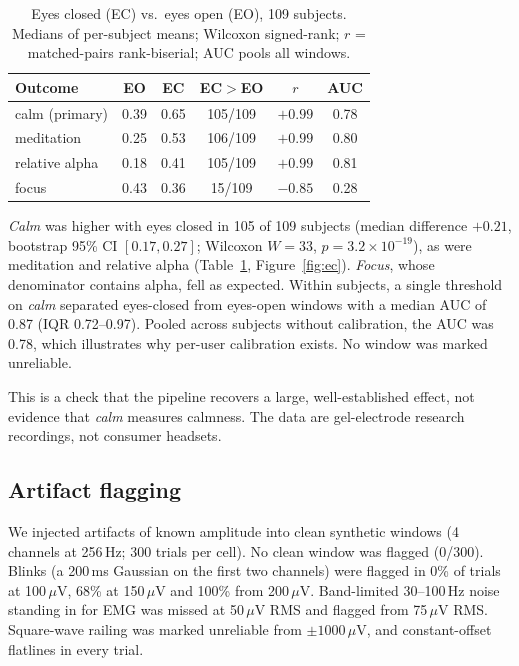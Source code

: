 \documentclass[10pt,twocolumn,letterpaper]{article}
\begin{document}
\begin{table}[t]
\centering\small
\caption{Eyes closed (EC) vs.\ eyes open (EO), 109 subjects. Medians of
per-subject means; Wilcoxon signed-rank; $r$ = matched-pairs rank-biserial;
AUC pools all windows.}
\label{tab:ec}
\begin{tabular}{@{}lccccc@{}}
\toprule
Outcome & EO & EC & EC$>$EO & $r$ & AUC \\
\midrule
calm (primary)  & 0.39 & 0.65 & 105/109 & $+0.99$ & 0.78 \\
meditation      & 0.25 & 0.53 & 106/109 & $+0.99$ & 0.80 \\
relative alpha  & 0.18 & 0.41 & 105/109 & $+0.99$ & 0.81 \\
focus           & 0.43 & 0.36 & 15/109  & $-0.85$ & 0.28 \\
\bottomrule
\end{tabular}
\end{table}

\emph{Calm} was higher with eyes closed in 105 of 109 subjects (median
difference $+0.21$, bootstrap 95\% CI $[0.17, 0.27]$; Wilcoxon $W = 33$,
$p = 3.2\times10^{-19}$), as were meditation and relative alpha
(Table~\ref{tab:ec}, Figure~\ref{fig:ec}). \emph{Focus}, whose denominator
contains alpha, fell as expected. Within subjects, a single threshold on
\emph{calm} separated eyes-closed from eyes-open windows with a median AUC of
0.87 (IQR 0.72--0.97). Pooled across subjects without calibration, the AUC was
0.78, which illustrates why per-user calibration exists. No window was marked
unreliable.

This is a check that the pipeline recovers a large, well-established effect, not
evidence that \emph{calm} measures calmness. The data are gel-electrode research
recordings, not consumer headsets.

\subsection{Artifact flagging}
We injected artifacts of known amplitude into clean synthetic windows (4
channels at 256\,Hz; 300 trials per cell). No clean window was flagged (0/300).
Blinks (a 200\,ms Gaussian on the first two channels) were flagged in 0\% of
trials at 100\,$\mu$V, 68\% at 150\,$\mu$V and 100\% from 200\,$\mu$V. Band-limited
30--100\,Hz noise standing in for EMG was missed at 50\,$\mu$V RMS and flagged
from 75\,$\mu$V RMS. Square-wave railing was marked unreliable from $\pm1000\,\mu$V,
and constant-offset flatlines in every trial.
\end{document}
